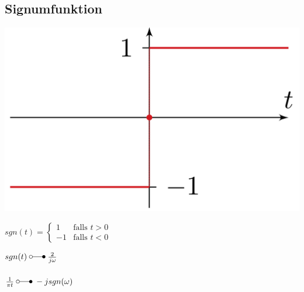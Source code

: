	\subsection{Signumfunktion}
		\begin{minipage}{0.2\textwidth}
			\includegraphics[width=\textwidth]{./bilder/funktionen/signF.png}
		\end{minipage}
		\qquad
		\begin{minipage}{0.45\textwidth}
			$sgn(t) = \begin{cases} 1 & \text{falls }t > 0 \\ -1 & \text{falls }t < 0 \end{cases}$
		\end{minipage}
		\qquad
		\begin{minipage}{0.25\textwidth}						
			$sgn(t) \; \laplace \; \frac{2}{j\omega}$\\
			\\
			$\frac{1}{\pi t} \; \laplace \; -j sgn(\omega)$\\
		\end{minipage}		

		
